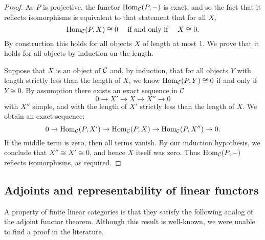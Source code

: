 \documentclass{amsart}
\begin{document}
\begin{proof}
As $P$ is projective, the functor $\operatorname{Hom}_{\mathcal C}(P,-)$ is exact, and so the fact that it reflects isomorphisms is equivalent to that statement that for all $X$, 
\begin{equation*}
	\operatorname{Hom}_{\mathcal C}(P,X) \cong 0 \quad \textrm{ if and only if } \quad X \cong 0.
\end{equation*} 
By construction this holds for all objects $X$ of length at most 1. We prove that it holds for all objects by induction on the length. 

Suppose that $X$ is an object of $\mathcal C$ and, by induction, that for all objects $Y$ with length strictly less than the length of $X$, we know $\operatorname{Hom}_{\mathcal C}(P,Y) \cong 0$ if and only if $Y \cong 0$. By assumption there exists an exact sequence in $\mathcal C$
\begin{equation*}
	0 \to X' \to X \to X'' \to 0
\end{equation*}
with $X''$ simple, and with the length of $X'$ strictly less than the length of $X$. We obtain an exact sequence:
\begin{equation*}
	0 \to \operatorname{Hom}_{\mathcal C}(P,X') \to \operatorname{Hom}_{\mathcal C}(P,X) \to \operatorname{Hom}_{\mathcal C}(P,X'') \to 0.
\end{equation*}
If the middle term is zero, then all terms vanish. By our induction hypothesis, we conclude that $X'' \cong X' \cong 0$, and hence $X$ itself was zero. Thus $\operatorname{Hom}_{\mathcal C}(P,-)$ reflects isomorphisms, as required.
\end{proof}

\subsection{Adjoints and representability of linear functors}

A property of finite linear categories is that they satisfy the following analog of the adjoint functor theorem.  Although this result is well-known, we were unable to find a proof in the literature.  
\end{document}
